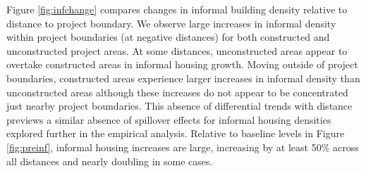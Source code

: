 \documentclass[12pt]{article}
\begin{document}
Figure \ref{fig:infchange} compares changes in informal building density relative to distance to project boundary.  We observe large increases in informal density within project boundaries (at negative distances) for both constructed and unconstructed project areas.  At some distances, unconstructed areas appear to overtake constructed areas in informal housing growth.  Moving outside of project boundaries, constructed areas experience larger increases in informal density than unconstructed areas although these increases do not appear to be concentrated just nearby project boundaries.  This absence of differential trends with distance previews a similar absence of spillover effects for informal housing densities explored further in the empirical analysis.  Relative to baseline levels in Figure \ref{fig:preinf}, informal housing increases are large, increasing by at least 50\% across all distances and nearly doubling in some cases.



\end{document}
